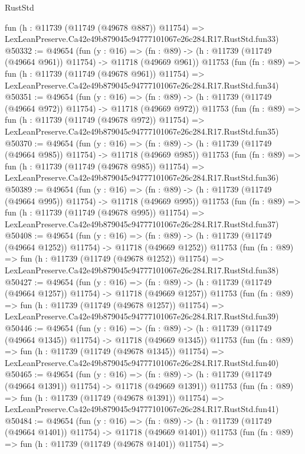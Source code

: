 \begin{lexlean}{RustStd}
\begin{coremodule}
    fun (h : @11739 (@11749 (@49678 @887)) @11754) =>
    LexLeanPreserve.Ca42e49b879045c94777101067e26c284.R17.RustStd.fun33)
@50332 := @49654
    (fun (y : @16) =>
    (fn : @89) -> (h : @11739 (@11749 (@49664 @961)) @11754) -> @11718 (@49669 @961))
    @11753
    (fun (fn : @89) =>
    fun (h : @11739 (@11749 (@49678 @961)) @11754) =>
    LexLeanPreserve.Ca42e49b879045c94777101067e26c284.R17.RustStd.fun34)
@50351 := @49654
    (fun (y : @16) =>
    (fn : @89) -> (h : @11739 (@11749 (@49664 @972)) @11754) -> @11718 (@49669 @972))
    @11753
    (fun (fn : @89) =>
    fun (h : @11739 (@11749 (@49678 @972)) @11754) =>
    LexLeanPreserve.Ca42e49b879045c94777101067e26c284.R17.RustStd.fun35)
@50370 := @49654
    (fun (y : @16) =>
    (fn : @89) -> (h : @11739 (@11749 (@49664 @985)) @11754) -> @11718 (@49669 @985))
    @11753
    (fun (fn : @89) =>
    fun (h : @11739 (@11749 (@49678 @985)) @11754) =>
    LexLeanPreserve.Ca42e49b879045c94777101067e26c284.R17.RustStd.fun36)
@50389 := @49654
    (fun (y : @16) =>
    (fn : @89) -> (h : @11739 (@11749 (@49664 @995)) @11754) -> @11718 (@49669 @995))
    @11753
    (fun (fn : @89) =>
    fun (h : @11739 (@11749 (@49678 @995)) @11754) =>
    LexLeanPreserve.Ca42e49b879045c94777101067e26c284.R17.RustStd.fun37)
@50408 := @49654
    (fun (y : @16) =>
    (fn : @89) -> (h : @11739 (@11749 (@49664 @1252)) @11754) -> @11718 (@49669 @1252))
    @11753
    (fun (fn : @89) =>
    fun (h : @11739 (@11749 (@49678 @1252)) @11754) =>
    LexLeanPreserve.Ca42e49b879045c94777101067e26c284.R17.RustStd.fun38)
@50427 := @49654
    (fun (y : @16) =>
    (fn : @89) -> (h : @11739 (@11749 (@49664 @1257)) @11754) -> @11718 (@49669 @1257))
    @11753
    (fun (fn : @89) =>
    fun (h : @11739 (@11749 (@49678 @1257)) @11754) =>
    LexLeanPreserve.Ca42e49b879045c94777101067e26c284.R17.RustStd.fun39)
@50446 := @49654
    (fun (y : @16) =>
    (fn : @89) -> (h : @11739 (@11749 (@49664 @1345)) @11754) -> @11718 (@49669 @1345))
    @11753
    (fun (fn : @89) =>
    fun (h : @11739 (@11749 (@49678 @1345)) @11754) =>
    LexLeanPreserve.Ca42e49b879045c94777101067e26c284.R17.RustStd.fun40)
@50465 := @49654
    (fun (y : @16) =>
    (fn : @89) -> (h : @11739 (@11749 (@49664 @1391)) @11754) -> @11718 (@49669 @1391))
    @11753
    (fun (fn : @89) =>
    fun (h : @11739 (@11749 (@49678 @1391)) @11754) =>
    LexLeanPreserve.Ca42e49b879045c94777101067e26c284.R17.RustStd.fun41)
@50484 := @49654
    (fun (y : @16) =>
    (fn : @89) -> (h : @11739 (@11749 (@49664 @1401)) @11754) -> @11718 (@49669 @1401))
    @11753
    (fun (fn : @89) =>
    fun (h : @11739 (@11749 (@49678 @1401)) @11754) =>

\end{coremodule}
\end{lexlean}
